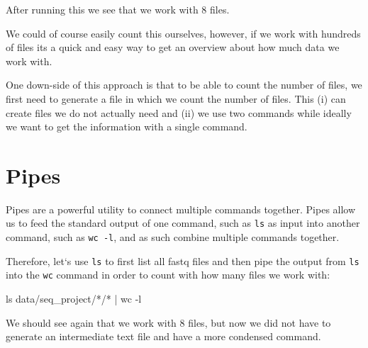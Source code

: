 \documentclass[
  letterpaper,
  DIV=11,
  numbers=noendperiod]{scrreprt}
\newenvironment{Shaded}{}{}
\newcommand{\AttributeTok}[1]{\textcolor[rgb]{0.84,0.23,0.29}{#1}}
\newcommand{\FunctionTok}[1]{\textcolor[rgb]{0.44,0.26,0.76}{#1}}
\newcommand{\KeywordTok}[1]{\textcolor[rgb]{0.84,0.23,0.29}{#1}}
\newcommand{\NormalTok}[1]{\textcolor[rgb]{0.14,0.16,0.18}{#1}}
\newcommand{\PreprocessorTok}[1]{\textcolor[rgb]{0.84,0.23,0.29}{#1}}
\begin{document}
After running this we see that we work with 8 files.

We could of course easily count this ourselves, however, if we work with
hundreds of files its a quick and easy way to get an overview about how
much data we work with.

One down-side of this approach is that to be able to count the number of
files, we first need to generate a file in which we count the number of
files. This (i) can create files we do not actually need and (ii) we use
two commands while ideally we want to get the information with a single
command.

\section{Pipes}\label{pipes}

Pipes are a powerful utility to connect multiple commands together.
Pipes allow us to feed the standard output of one command, such as
\texttt{ls} as input into another command, such as \texttt{wc\ -l}, and
as such combine multiple commands together.

Therefore, let`s use \texttt{ls} to first list all fastq files and then
pipe the output from \texttt{ls} into the \texttt{wc} command in order
to count with how many files we work with:

\begin{Shaded}
\begin{Highlighting}[]
\FunctionTok{ls}\NormalTok{ data/seq\_project/}\PreprocessorTok{*}\NormalTok{/}\PreprocessorTok{*} \KeywordTok{|} \FunctionTok{wc} \AttributeTok{{-}l}
\end{Highlighting}
\end{Shaded}

We should see again that we work with 8 files, but now we did not have
to generate an intermediate text file and have a more condensed command.
\end{document}
